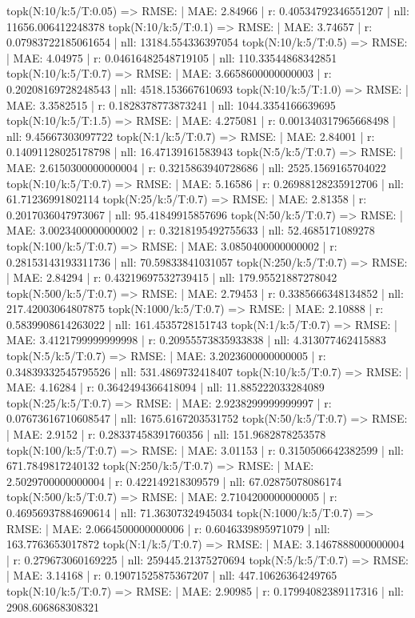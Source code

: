 topk(N:10/k:5/T:0.05) => RMSE: | MAE: 2.84966 | r: 0.40534792346551207 | nll: 11656.006412248378
topk(N:10/k:5/T:0.1) => RMSE: | MAE: 3.74657 | r: 0.07983722185061654 | nll: 13184.554336397054
topk(N:10/k:5/T:0.5) => RMSE: | MAE: 4.04975 | r: 0.04616482548719105 | nll: 110.33544868342851
topk(N:10/k:5/T:0.7) => RMSE: | MAE: 3.6658600000000003 | r: 0.20208169728248543 | nll: 4518.153667610693
topk(N:10/k:5/T:1.0) => RMSE: | MAE: 3.3582515 | r: 0.1828378773873241 | nll: 1044.3354166639695
topk(N:10/k:5/T:1.5) => RMSE: | MAE: 4.275081 | r: 0.001340317965668498 | nll: 9.45667303097722
topk(N:1/k:5/T:0.7) => RMSE: | MAE: 2.84001 | r: 0.14091128025178798 | nll: 16.47139161583943
topk(N:5/k:5/T:0.7) => RMSE: | MAE: 2.6150300000000004 | r: 0.3215863940728686 | nll: 2525.1569165704022
topk(N:10/k:5/T:0.7) => RMSE: | MAE: 5.16586 | r: 0.26988128235912706 | nll: 61.71236991802114
topk(N:25/k:5/T:0.7) => RMSE: | MAE: 2.81358 | r: 0.2017036047973067 | nll: 95.41849915857696
topk(N:50/k:5/T:0.7) => RMSE: | MAE: 3.0023400000000002 | r: 0.3218195492755633 | nll: 52.4685171089278
topk(N:100/k:5/T:0.7) => RMSE: | MAE: 3.0850400000000002 | r: 0.28153143193311736 | nll: 70.59833841031057
topk(N:250/k:5/T:0.7) => RMSE: | MAE: 2.84294 | r: 0.43219697532739415 | nll: 179.95521887278042
topk(N:500/k:5/T:0.7) => RMSE: | MAE: 2.79453 | r: 0.3385666348134852 | nll: 217.42003064807875
topk(N:1000/k:5/T:0.7) => RMSE: | MAE: 2.10888 | r: 0.5839908614263022 | nll: 161.4535728151743
topk(N:1/k:5/T:0.7) => RMSE: | MAE: 3.4121799999999998 | r: 0.20955573835933838 | nll: 4.313077462415883
topk(N:5/k:5/T:0.7) => RMSE: | MAE: 3.2023600000000005 | r: 0.34839332545795526 | nll: 531.4869732418407
topk(N:10/k:5/T:0.7) => RMSE: | MAE: 4.16284 | r: 0.3642494366418094 | nll: 11.885222033284089
topk(N:25/k:5/T:0.7) => RMSE: | MAE: 2.9238299999999997 | r: 0.07673616710608547 | nll: 1675.6167203531752
topk(N:50/k:5/T:0.7) => RMSE: | MAE: 2.9152 | r: 0.28337458391760356 | nll: 151.9682878253578
topk(N:100/k:5/T:0.7) => RMSE: | MAE: 3.01153 | r: 0.3150506642382599 | nll: 671.7849817240132
topk(N:250/k:5/T:0.7) => RMSE: | MAE: 2.5029700000000004 | r: 0.422149218309579 | nll: 67.02875078086174
topk(N:500/k:5/T:0.7) => RMSE: | MAE: 2.7104200000000005 | r: 0.46956937884690614 | nll: 71.36307324945034
topk(N:1000/k:5/T:0.7) => RMSE: | MAE: 2.0664500000000006 | r: 0.6046339895971079 | nll: 163.7763653017872
topk(N:1/k:5/T:0.7) => RMSE: | MAE: 3.1467888000000004 | r: 0.279673060169225 | nll: 259445.21375270694
topk(N:5/k:5/T:0.7) => RMSE: | MAE: 3.14168 | r: 0.19071525875367207 | nll: 447.10626364249765
topk(N:10/k:5/T:0.7) => RMSE: | MAE: 2.90985 | r: 0.17994082389117316 | nll: 2908.606868308321
